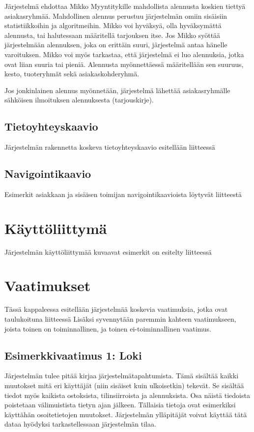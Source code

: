     Järjestelmä ehdottaa Mikko Myyntitykille mahdollista alennusta koskien tiettyä asiakasryhmää.
    Mahdollinen alennus perustuu järjestelmän omiin sisäisiin statistiikkoihin ja algoritmeihin.
    Mikko voi hyväksyä, olla hyväksymättä alennusta, tai halutessaan määritellä tarjouksen itse.
    Jos Mikko syöttää järjestelmään alennuksen, joka on erittäin suuri, järjestelmä antaa hänelle varoituksen.
    Mikko voi myös tarkastaa, että järjestelmä ei luo alennuksia, jotka ovat liian suuria tai pieniä.
    Alennusta myönnettäessä määritellään sen suuruus, kesto, tuoteryhmät sekä asiakaskohderyhmä.

    Jos jonkinlainen alennus myönnetään, järjestelmä lähettää asiakasryhmälle sähköisen ilmoituksen alennuksesta (tarjouskirje).

\subsection{Tietoyhteyskaavio}   %

    Järjestelmän rakennetta koskeva tietoyhteyskaavio esitellään liitteessä %

\subsection{Navigointikaavio}     %
    
    Esimerkit asiakkaan ja sisäisen toimijan navigointikaavioista löytyvät liitteestä %
    
\section{Käyttöliittymä}  %
    
    Järjestelmän käyttöliittymää kuvaavat esimerkit on esitelty liitteessä %

\section{Vaatimukset}       %

    Tässä kappaleessa esitellään järjestelmää koskevia vaatimuksia, jotka ovat taulukoituna liitteessä %
    Lisäksi syvennytään paremmin kahteen vaatimukseen, joista toinen on toiminnallinen, ja toinen ei-toiminnallinen
    vaatimus.

    \subsection{Esimerkkivaatimus 1: Loki}
        Järjestelmän tulee pitää kirjaa järjestelmätapahtumista. Tämä sisältää kaikki muutokset mitä eri käyttäjät (niin sisäiset kuin ulkoisetkin) tekevät.
        Se sisältää tiedot myös kaikista ostoksista, tilinsiirroista ja alennuksista. Osa näistä tiedoista poistetaan välimuistista tietyn ajan 
        jälkeen. Tällaisia tietoja ovat esimerkiksi käyttähän osoitetietojen muutokset. Järjestelmän ylläpitäjät voivat käyttää tätä dataa hyödyksi tarkastellessaan 
        järjestelmän tilaa. 
